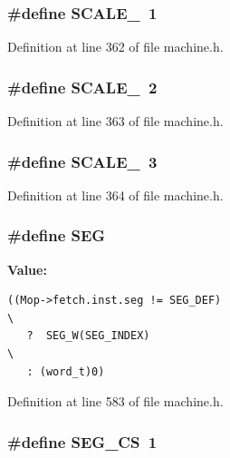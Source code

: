 \subsubsection[{SCALE\_\-2}]{\setlength{\rightskip}{0pt plus 5cm}\#define SCALE\_~1}\label{machine_8h_35552a6de7892611f4ee416e47b10af0}




Definition at line 362 of file machine.h.
\subsubsection[{SCALE\_\-4}]{\setlength{\rightskip}{0pt plus 5cm}\#define SCALE\_~2}\label{machine_8h_4b4df2d807fa873260a8c32c3174070d}




Definition at line 363 of file machine.h.
\subsubsection[{SCALE\_\-8}]{\setlength{\rightskip}{0pt plus 5cm}\#define SCALE\_~3}\label{machine_8h_eb4f405905c6452cf22e4a2cdb232acb}




Definition at line 364 of file machine.h.
\subsubsection[{SEG}]{\setlength{\rightskip}{0pt plus 5cm}\#define SEG}\label{machine_8h_6caf03c3bd2a5c38311029687b07c441}


\textbf{Value:}

\begin{Code}\begin{verbatim}((Mop->fetch.inst.seg != SEG_DEF)                                              \
   ?  SEG_W(SEG_INDEX)                                                   \
   : (word_t)0)
\end{verbatim}
\end{Code}


Definition at line 583 of file machine.h.
\subsubsection[{SEG\_\-CS}]{\setlength{\rightskip}{0pt plus 5cm}\#define SEG\_\-CS~1}\label{machine_8h_64e5aa42ead15b670c7d3ec47933b600}




